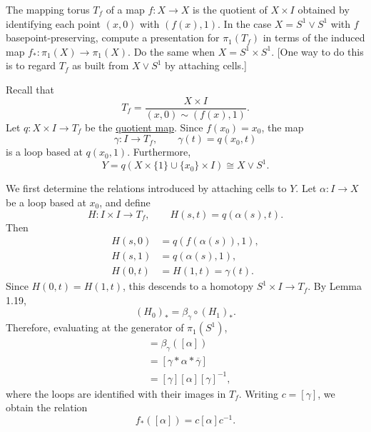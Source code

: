 	\begin{exercise}[Hatcher 1.2.11]
		The mapping torus $T_f$ of a map $f: X \to X$ is the quotient of $X \times I$ obtained by identifying each point $(x,0)$ with $(f(x),1)$. In the case $X = S^1 \vee S^1$ with $f$ basepoint-preserving, compute a presentation for $\pi_1(T_f)$ in terms of the induced map $f_\ast: \pi_1(X) \to \pi_1(X)$. Do the same when $X = S^1 \times S^1$. [One way to do this is to regard $T_f$ as built from $X \vee S^1$ by attaching cells.]
	\end{exercise}
	\begin{solution}
		Recall that
		\begin{equation}
			T_f = \frac{X \times I}{(x,0) \sim (f(x),1)}.
		\end{equation}
		Let $q: X \times I \to T_f$ be the \hyperref[pst-def:quotient-map]{quotient map}. Since
		$f(x_0) = x_0$, the map
		\begin{equation}
			\gamma: I \to T_f, \qquad \gamma(t) = q(x_0,t)
		\end{equation}
		is a loop based at $q(x_0,1)$. Furthermore,
		\begin{equation}
			Y = q(X \times \{1\} \cup \{x_0\} \times I)
			\cong X \vee S^1.
		\end{equation}

		We first determine the relations introduced by attaching
		cells to $Y$. Let $\alpha: I \to X$ be a loop based at $x_0$,
		and define
		\begin{equation}
			H: I \times I \to T_f, \qquad
			H(s,t) = q(\alpha(s),t).
		\end{equation}
		Then
		\begin{align}
			H(s,0) &= q(f(\alpha(s)),1),\\
			H(s,1) &= q(\alpha(s),1),\\
			H(0,t) &= H(1,t) = \gamma(t).
		\end{align}
		Since $H(0,t)=H(1,t)$, this descends to a homotopy
		$S^1 \times I \to T_f$. By Lemma 1.19,
		\begin{equation}
			(H_0)_\ast = \beta_\gamma \circ (H_1)_\ast.
		\end{equation}
		Therefore, evaluating at the generator of $\pi_1(S^1)$,
		\begin{align}
			[f \circ \alpha]
				&= \beta_\gamma([\alpha])\\
				&= [\gamma \ast \alpha \ast \overline{\gamma}]\\
				&= [\gamma][\alpha][\gamma]^{-1},
		\end{align}
		where the loops are identified with their images in $T_f$.
		Writing $c=[\gamma]$, we obtain the relation
		\begin{equation}
			f_\ast([\alpha]) = c[\alpha]c^{-1}.
		\end{equation}


\end{solution}
